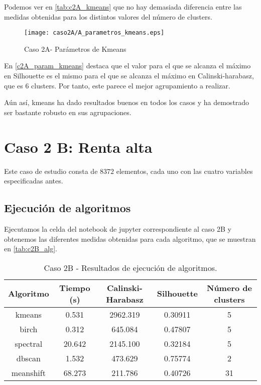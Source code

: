 Podemos ver en \eqref{tab:c2A_kmeans} que no hay demasiada diferencia entre las medidas obtenidas para los distintos valores del número de clusters.

\begin{figure}[H]
\caption{Caso 2A- Parámetros de Kmeans}
\label{c2A_param_kmeans}
\texttt{[image: caso2A/A\_parametros\_kmeans.eps]}
\end{figure}

En \eqref{c2A_param_kmeans} destaca que el valor para el que se alcanza el máximo en Silhouette es el mismo para el que se alcanza el máximo en Calinski-harabasz, que es 6 clusters. Por tanto, este parece el mejor agrupamiento a realizar.

Aún así, kmeans ha dado resultados buenos en todos los casos y ha demostrado ser bastante robusto en sus agrupaciones.



\section{Caso 2 B: Renta alta}

Este caso de estudio consta de $8372$ elementos, cada uno con las cuatro variables especificadas antes.

\subsection{Ejecución de algoritmos}

Ejecutamos la celda del notebook de jupyter correspondiente al caso 2B y obtenemos las diferentes medidas obtenidas para cada algoritmo, que se muestran en \eqref{tab:c2B_alg}.

\begin{table}[H]
\centering
\caption{Caso 2B - Resultados de ejecución de algoritmos.}
\label{tab:c2_alg}
\begin{tabular}{ccccc}
\toprule
 Algoritmo & Tiempo (s) & Calinski-Harabasz & Silhouette & Número de clusters \\
\midrule
kmeans & 0.531 & 2962.319 & 0.30911 & 5 \\
birch & 0.312 & 645.084 & 0.47807 & 5 \\
spectral & 20.642 & 2145.100 & 0.32184 & 5 \\
dbscan & 1.532 & 473.629 & 0.75774 & 2 \\
meanshift & 68.273 & 211.786 & 0.40726 & 31 \\
\bottomrule
\end{tabular}
\end{table}

